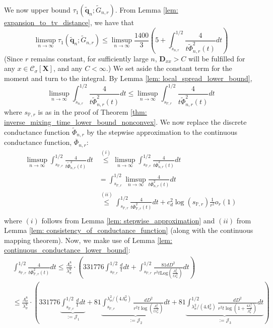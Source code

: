 \documentclass{article}
\newcommand{\1}{\mathbf{1}}
\newcommand{\Log}{\mathrm{Log}}
\newcommand{\qbf}{\mathbf{q}}
\newcommand{\Xbf}{\mathbf{X}}
\newcommand{\Dbf}{\mathbf{D}}
\newcommand{\Pbb}{\mathbb{P}}
\newcommand{\Cset}{\mathcal{C}}
\newcommand{\Csig}{\Cset_{\sigma}}
\theoremstyle{aldenthm}
\begin{document}
We now upper bound $\tau_{1}(\widetilde{\qbf}_n; \widetilde{G}_{n,r})$.  From Lemma \ref{lem: expansion_to_tv_distance}, we have that
\begin{equation}
\label{eqn: mixing_time_bound_on_neighborhood_graph}
\limsup_{n \to \infty} \tau_{1}(\widetilde{\qbf}_n; \widetilde{G}_{n,r}) \leq \limsup_{n \to \infty} \frac{1400}{3}\left(5 + \int_{\widetilde{s}_{n,r}}^{1/2} \frac{4}{t\widetilde{\Phi}_{n,r}^2(t)} dt\right)
\end{equation}
(Since $r$ remains constant, for sufficiently large $n$, $\Dbf_{xx} > C$ will be fulfilled for any $x \in \Csig[\Xbf]$, and any $C < \infty$.)
We set aside the constant term for the moment and turn to the integral. By Lemma \ref{lem: local_spread_lower_bound},
\begin{equation*}
\limsup_{n \to \infty}\int_{\widetilde{s}_{n,r}}^{1/2} \frac{4}{t\widetilde{\Phi}_{n,r}^2(t)} dt \leq \limsup_{n \to \infty}\int_{ s_{\Pbb,r}}^{1/2} \frac{4}{t\widetilde{\Phi}_{n,r}^2(t)} dt
\end{equation*}
where $s_{\Pbb,r}$ is as in the proof of Theorem \ref{thm: inverse_mixing_time_lower_bound_nonconvex}. We now replace the discrete conductance function $\widetilde{\Phi}_{n,r}$ by the stepwise approximation to the continuous conductance function, $\overline{\Phi}_{n,r}$:
\begin{align*}
\limsup_{n \to \infty}\int_{s_{\Pbb,r}}^{1/2} \frac{4}{t\widetilde{\Phi}_{n,r}^2(t)} dt & \overset{(i)}{\leq} \limsup_{n \to \infty}\int_{s_{\Pbb,r}}^{1/2} \frac{4}{t\overline{\Phi}_{n,r}^2(t)} dt \\
& = \int_{s_{\Pbb,r}}^{1/2} \limsup_{n \to \infty} \frac{4}{t\overline{\Phi}_{n,r}^2(t)} dt\\
& \overset{(ii)}{\leq} \int_{s_{\Pbb,r}}^{1/2} \frac{4}{t\overline{\Phi}_{\Pbb,r}^2(t)} dt + c_d^2 \log(s_{\Pbb,r}) \frac{1}{r^2} o_r(1)\\
\end{align*}
where $(i)$ follows from Lemma \ref{lem: stepwise_approximation} and $(ii)$ from Lemma \ref{lem: consistency_of_conductance_function} (along with the continuous mapping theorem). Now, we make use of Lemma \ref{lem: continuous_conductance_lower_bound}:
\begin{align*}
& \int_{s_{\Pbb,r}}^{1/2} \frac{4}{t\overline{\Phi}_{\Pbb,r}^2(t)} dt \leq \frac{\Lambda_{\sigma}^8}{\lambda_{\sigma}^8} \cdot \left( 331776
\int_{s_{\Pbb,r}}^{1/2} \frac{d}{t} dt + \int_{s_{\Pbb,r}}^{1/2} \frac{81dD^2}{r^2t \Log(\frac{\Lambda_{\sigma}^2}{t\lambda_{\sigma}^2})}  dt\right) \\
& \leq \frac{\Lambda_{\sigma}^8}{\lambda_{\sigma}^8} \cdot \left( 331776
\underbrace{\int_{s_{\Pbb,r}}^{1/2} \frac{d}{t} dt}_{:= \mathcal{J}_1} + 
81\underbrace{\int_{s_{\Pbb,r}}^{\lambda_{\sigma}^2/(4 \Lambda_{\sigma}^2)} \frac{dD^2}{r^2t \log(\frac{\Lambda_{\sigma}^2}{t\lambda_{\sigma}^2})} dt}_{:= \mathcal{J}_2} +
81\underbrace{\int_{\lambda_{\sigma}^2/(4 \Lambda_{\sigma}^2)}^{1/2} \frac{dD^2}{r^2t \log(1 + \frac{4 \lambda_{\sigma}^2}{\Lambda_{\sigma}^2})}dt}_{:= \mathcal{J}_3}  \right)
\end{align*}
\end{document}
